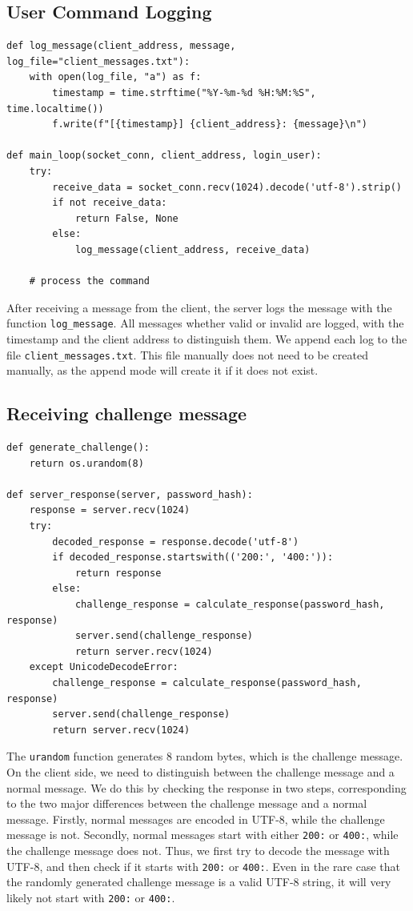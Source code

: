 \documentclass[a4paper,12pt]{article}
\begin{document}
\subsection{User Command Logging}

\begin{verbatim}
def log_message(client_address, message, log_file="client_messages.txt"):
    with open(log_file, "a") as f:
        timestamp = time.strftime("%Y-%m-%d %H:%M:%S", time.localtime())
        f.write(f"[{timestamp}] {client_address}: {message}\n")

def main_loop(socket_conn, client_address, login_user):
    try:
        receive_data = socket_conn.recv(1024).decode('utf-8').strip()
        if not receive_data:
            return False, None
        else:
            log_message(client_address, receive_data)

    # process the command
\end{verbatim}

After receiving a message from the client, the server logs the message with the function \texttt{log\_message}.
All messages whether valid or invalid are logged, with the timestamp and the client address to distinguish them.
We append each log to the file \texttt{client\_messages.txt}.
This file manually does not need to be created manually, as the append mode will create it if it does not exist.

\subsection{Receiving challenge message}

\begin{verbatim}
def generate_challenge():
    return os.urandom(8)

def server_response(server, password_hash):
    response = server.recv(1024)
    try:
        decoded_response = response.decode('utf-8')
        if decoded_response.startswith(('200:', '400:')):
            return response
        else:
            challenge_response = calculate_response(password_hash, response)
            server.send(challenge_response)
            return server.recv(1024)
    except UnicodeDecodeError:
        challenge_response = calculate_response(password_hash, response)
        server.send(challenge_response)
        return server.recv(1024)
\end{verbatim}

The \texttt{urandom} function generates 8 random bytes, which is the challenge message.
On the client side, we need to distinguish between the challenge message and a normal message.
We do this by checking the response in two steps, corresponding to the two major differences between the challenge message and a normal message.
Firstly, normal messages are encoded in UTF-8, while the challenge message is not.
Secondly, normal messages start with either \texttt{200:} or \texttt{400:}, while the challenge message does not.
Thus, we first try to decode the message with UTF-8, and then check if it starts with \texttt{200:} or \texttt{400:}.
Even in the rare case that the randomly generated challenge message is a valid UTF-8 string, it will very likely not start with \texttt{200:} or \texttt{400:}.
\end{document}
